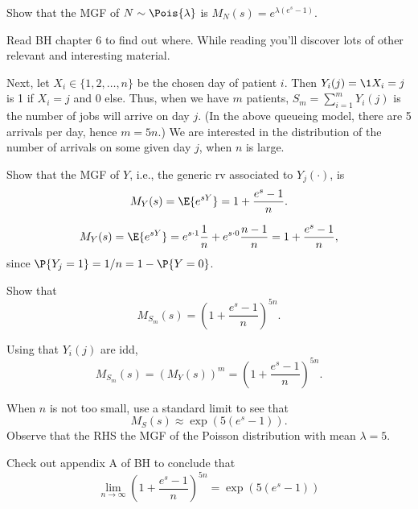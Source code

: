\begin{exercise}
Show that the MGF of $N\sim \Pois{\lambda}$ is $M_{N}(s)= e^{\lambda(e^s-1)}$.
\begin{solution}
Read BH chapter 6 to find out where. While reading you'll discover lots of other relevant and interesting material.
\end{solution}
\end{exercise}

Next, let \(X_{i}\in\{1, 2, \ldots, n\}\) be the chosen day of patient \(i\).
Then \(Y_{i}(j)=\1{X_{i}=j}\) is 1 if \(X_i=j\) and 0 else.
Thus, when we have \(m\) patients, \(S_{m}=\sum_{i=1}^{m} Y_i(j)\) is the number of jobs will arrive on day \(j\).
(In the above queueing model, there are 5 arrivals per day, hence \(m=5n\).) We are interested in the distribution of the number of arrivals on some given day $j$, when $n$ is large.

\begin{exercise}
Show that the MGF of \(Y\), i.e., the generic rv associated to \(Y_j(\cdot)\), is
\begin{equation}
\label{eq:2}
M_Y(s) = \E{e^{s Y}}  = 1 + \frac{e^s-1}{n}.
\end{equation}
\begin{solution}
\begin{equation*}
M_Y(s) = \E{e^{s Y}} = e^{s\cdot 1} \frac{1}{n} + e^{s\cdot 0} \frac{n-1}{n} = 1 + \frac{e^s-1}{n},
\end{equation*}
since \(\P{Y_j=1} = 1/n = 1-\P{Y=0}\).
\end{solution}
\end{exercise}

\begin{exercise}
Show that
\begin{equation}
M_{S_{m}}(s) = \left( 1 + \frac{e^s-1}{n}\right)^{5n}.
\end{equation}
\begin{solution}
Using that  \(Y_i(j)\) are idd,
\begin{equation}
M_{S_{m}}(s) = \left( M_Y(s)\right)^m = \left( 1 + \frac{e^s-1}{n}\right)^{5n}.
\end{equation}
\end{solution}
\end{exercise}

\begin{exercise}
When \(n\) is not too small, use a standard limit to see that
\begin{equation}
M_S(s) \approx \exp(5(e^s-1)).
\end{equation}
Observe that the RHS the MGF of the Poisson distribution with mean \(\lambda = 5\).
\begin{solution}
Check out appendix A of BH to conclude that
\begin{equation}
\lim_{n\to\infty}\left( 1 + \frac{e^s-1}{n}\right)^{5n} =\exp(5(e^s-1))
\end{equation}
\end{solution}
\end{exercise}

